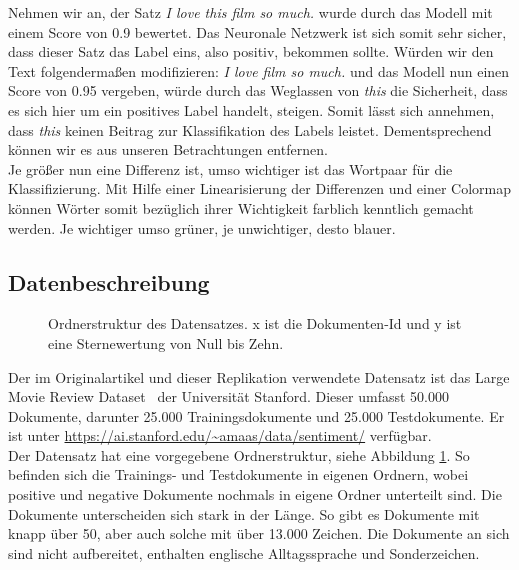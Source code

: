 \documentclass[DIV=13,fontsize=11pt]{scrartcl}
\begin{document}
Nehmen wir an, der Satz \textit{I love this film so much.} wurde durch das Modell mit
einem Score von 0.9 bewertet. Das Neuronale Netzwerk ist sich somit sehr sicher,
dass dieser Satz das Label eins, also positiv, bekommen sollte. Würden wir den Text
folgendermaßen modifizieren: \textit{I love film so much.} und das Modell
nun einen Score von 0.95 vergeben, würde durch das Weglassen von \textit{this} die
Sicherheit, dass es sich hier um ein positives Label handelt, steigen.
Somit lässt sich annehmen, dass \textit{this} keinen Beitrag zur Klassifikation
des Labels leistet. Dementsprechend können wir es aus unseren Betrachtungen entfernen.\\

Je größer nun eine Differenz ist, umso wichtiger ist das
Wortpaar für die Klassifizierung. Mit Hilfe einer Linearisierung der Differenzen
und einer Colormap können Wörter somit bezüglich ihrer Wichtigkeit
farblich kenntlich gemacht werden. Je wichtiger umso grüner, je unwichtiger, desto blauer.

\subsection{Datenbeschreibung}

\begin{figure}[H]
    \centering
    \begin{minipage}{5cm}
    \end{minipage}
    \caption{Ordnerstruktur des Datensatzes. x ist die Dokumenten-Id und y ist eine Sternewertung von Null bis Zehn.}
    \label{fig:filestruc}
\end{figure}

Der im Originalartikel und dieser Replikation verwendete Datensatz ist das Large Movie
Review Dataset~\cite{maas-EtAl:2011:ACL-HLT2011} der Universität Stanford.
Dieser umfasst 50.000 Dokumente, darunter 25.000 Trainingsdokumente und 25.000 Testdokumente. Er ist unter
\url{https://ai.stanford.edu/~amaas/data/sentiment/} verfügbar.\\

Der Datensatz hat eine vorgegebene Ordnerstruktur, siehe Abbildung \ref{fig:filestruc}.
So befinden sich die Trainings- und Testdokumente in eigenen Ordnern,
wobei positive und negative Dokumente nochmals in eigene Ordner unterteilt sind.
Die Dokumente unterscheiden sich stark in der Länge. So gibt es Dokumente mit knapp über 50,
aber auch solche mit über 13.000 Zeichen.
Die Dokumente an sich sind nicht aufbereitet, enthalten englische Alltagssprache und Sonderzeichen.
\end{document}
